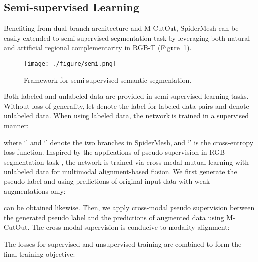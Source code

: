 \documentclass[letterpaper, 10 pt, conference]{ieeeconf}
\begin{document}
\subsection{Semi-supervised Learning}

Benefiting from dual-branch architecture and M-CutOut, SpiderMesh can be easily extended to semi-supervised segmentation task by leveraging both natural and artificial regional complementarity in RGB-T (Figure~\ref{fig:semi}). 

\begin{figure}[htbp]
  \centering
  \texttt{[image: ./figure/semi.png]}
  \caption{Framework for semi-supervised semantic segmentation.}
  \label{fig:semi}
\end{figure}

Both labeled and unlabeled data are provided in semi-supervised learning tasks. Without loss of generality, let  denote the label for labeled data pairs  and  denote unlabeled data. 
When using labeled data, the network is trained in a supervised manner:

where `' and `' denote the two branches in SpiderMesh, and `' is the cross-entropy loss function. Inspired by the applications of pseudo supervision in RGB segmentation task \cite{Chen_2021_CVPR, cpcl}, the network is trained via cross-modal mutual learning with unlabeled data for multimodal alignment-based fusion. 
We first generate the pseudo label  and  using predictions of original input data with weak augmentations only:

 can be obtained likewise.
Then, we apply cross-modal pseudo supervision between the generated pseudo label and the predictions of augmented data using M-CutOut. The cross-modal supervision is conducive to modality alignment: 


The losses for supervised and unsupervised training are combined to form the final training objective:
\end{document}
